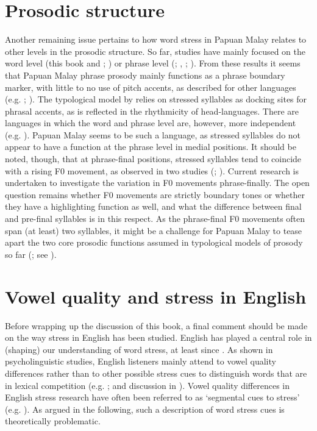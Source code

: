 \section{Prosodic structure}
Another remaining issue pertains to how word stress in Papuan Malay relates to other levels in the prosodic structure. So far, studies have mainly focused on the word level (this book and \citealt{kaland_repetition_2018}; \citealt{kaland_role_2022}) or phrase level (\citealt{riesberg_perception_2018}; \citealt{riesberg_using_2020}, \citealt{kaland_demarcating_2020}; \citealt{kaland_red_2023}). From these results it seems that Papuan Malay phrase prosody mainly functions as a phrase boundary marker, with little to no use of pitch accents, as described for other languages (e.g. \citealt{jun_prosodic_2005}; \citealt{jun_prosodic_2014}). The typological model by \citet{jun_prosodic_2014} relies on stressed syllables as docking sites for phrasal accents, as is reflected in the rhythmicity of head-languages. There are languages in which the word and phrase level are, however, more independent (e.g. \citealt{lindstrom_aspects_2005}). Papuan Malay seems to be such a language, as stressed syllables do not appear to have a function at the phrase level in medial positions. It should be noted, though, that at phrase-final positions, stressed syllables tend to coincide with a rising F0 movement, as observed in two studies (\citealt{kaland_demarcating_2020}; \citealt{kaland_red_2023}). Current research is undertaken to investigate the variation in F0 movements phrase-finally. The open question remains whether F0 movements are strictly boundary tones or whether they have a highlighting function as well, and what the difference between final and pre-final syllables is in this respect. As the phrase-final F0 movements often span (at least) two syllables, it might be a challenge for Papuan Malay to tease apart the two core prosodic functions assumed in typological models of prosody so far (\citealt{jun_prosodic_2014}; see \citealt{kaland_demarcating_2020}).

\section{Vowel quality and stress in English}
Before wrapping up the discussion of this book, a final comment should be made on the way stress in English has been studied. English has played a central role in (shaping) our understanding of word stress, at least since \citet{fry_duration_1955}. As shown in psycholinguistic studies, English listeners mainly attend to vowel quality differences rather than to other possible stress cues to distinguish words that are in lexical competition (e.g. \citealt{cooper_constraints_2002}; and discussion in \citealt{cutler_native_2012}). Vowel quality differences in English stress research have often been referred to as `segmental cues to stress' (e.g. \citealt{tremblay_dutch_2021}). As argued in the following, such a description of word stress cues is theoretically problematic.\par

